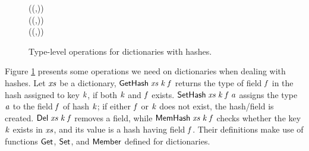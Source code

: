 \begin{figure}[t]
\begin{hscode}
\>[B]{}\<[5]%
\>[5]{}\;(\mbox{\textquotesingle}(,\;){}\<[36]%
\>[36]{}\mathrel{\,\mbox{\textquotesingle}\!:})\;{}\<[45]%
\>[45]{}\;\mathrel{=}\;\;\<[E]%
\\
\>[B]{}\<[5]%
\>[5]{}\;(\mbox{\textquotesingle}(,){}\<[36]%
\>[36]{}\mathrel{\,\mbox{\textquotesingle}\!:})\;{}\<[45]%
\>[45]{}\;\mathrel{=}\mbox{\textquotesingle}\<[E]%
\\
\>[B]{}\<[5]%
\>[5]{}\;(\mbox{\textquotesingle}(,){}\<[36]%
\>[36]{}\mathrel{\,\mbox{\textquotesingle}\!:})\;{}\<[45]%
\>[45]{}\;\mathrel{=}\;\;\;\<[E]%
\ColumnHook
\end{hscode}\resethooks
\caption{Type-level operations for dictionaries with hashes.}
\label{fig:xxxHash}
\end{figure}

Figure \ref{fig:xxxHash} presents some operations we need on dictionaries when
dealing with hashes. Let \ensuremath{\Varid{xs}} be a dictionary, \ensuremath{\Conid{GetHash}\;\Varid{xs}\;\Varid{k}\;\Varid{f}} returns the type
of field \ensuremath{\Varid{f}} in the hash assigned to key \ensuremath{\Varid{k}}, if both \ensuremath{\Varid{k}} and \ensuremath{\Varid{f}} exists.
\ensuremath{\Conid{SetHash}\;\Varid{xs}\;\Varid{k}\;\Varid{f}\;\Varid{a}} assigns the type \ensuremath{\Varid{a}} to the field \ensuremath{\Varid{f}} of hash \ensuremath{\Varid{k}}; if either
\ensuremath{\Varid{f}} or \ensuremath{\Varid{k}} does not exist, the hash/field is created. \ensuremath{\Conid{Del}\;\Varid{xs}\;\Varid{k}\;\Varid{f}} removes a
field, while \ensuremath{\Conid{MemHash}\;\Varid{xs}\;\Varid{k}\;\Varid{f}} checks whether the key \ensuremath{\Varid{k}} exists in \ensuremath{\Varid{xs}}, and its
value is a hash having field \ensuremath{\Varid{f}}. Their definitions make use of functions \ensuremath{\Conid{Get}},
\ensuremath{\Conid{Set}}, and \ensuremath{\Conid{Member}} defined for dictionaries.

